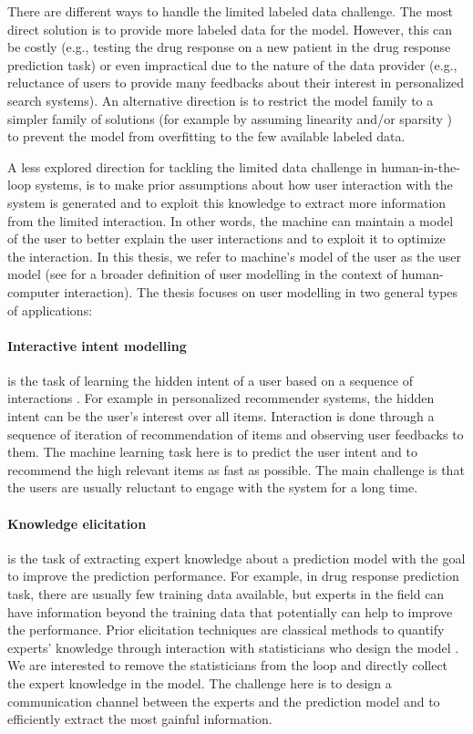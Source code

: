 \documentclass[dissertation,math,vertlayout,pdfa,colorlinks]{aaltoseries}
\begin{document}
There are different ways to handle the limited labeled data challenge. The most direct solution is to provide more labeled data for the model. However, this can be costly (e.g., testing the drug response on a new patient in the drug response prediction task) or even impractical due to the nature of the data provider (e.g., reluctance of users to provide many feedbacks about their interest in personalized search systems). An alternative direction is to restrict the model family to a simpler family of solutions (for example by assuming linearity and/or sparsity \cite{lasso2011}) to prevent the model from overfitting to the few available labeled data. 

A less explored direction for tackling the limited data challenge in human-in-the-loop systems, is to make prior assumptions about how user interaction with the system is generated and to exploit this knowledge to extract more information from the limited interaction. In other words, the machine can maintain a model of the user to better explain the user interactions and to exploit it to optimize the interaction. In this thesis, we refer to machine's model of the user as the user model (see \cite{user_modelling_2001} for a broader definition of user modelling in the context of human-computer interaction). The thesis focuses on user modelling in two general types of applications:

\paragraph{Interactive intent modelling} is the task of learning the hidden intent of a user based on a sequence of interactions \cite{ruotsalo2015interactive}. For example in personalized recommender systems, the hidden intent can be the user's interest over all items. Interaction is done through a sequence of iteration of recommendation of items and observing user feedbacks to them. The machine learning task here is to predict the user intent and to recommend the high relevant items as fast as possible. The main challenge is that the users are usually reluctant to engage with the system for a long time. %

\paragraph{Knowledge elicitation} is the task of extracting expert knowledge about a prediction model with the goal to improve the prediction performance. For example, in drug response prediction task, there are usually few training data available, but experts in the field can have information beyond the training data that potentially can help to improve the performance. Prior elicitation techniques are classical methods to quantify experts' knowledge through interaction with statisticians who design the model \cite{OHagan06}. We are interested to remove the statisticians from the loop and directly collect the expert knowledge in the model. The challenge here is to design a communication channel between the experts and the prediction model and to efficiently extract the most gainful information.   
\end{document}
